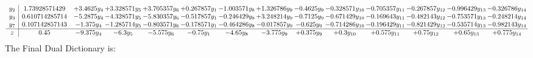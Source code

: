 \documentclass[11pt]{article}
\begin{document}
\[\begin{array}{c| c c@{\hskip 2pt} c@{\hskip 2pt} c@{\hskip 2pt} c@{\hskip 2pt} c@{\hskip 2pt} c@{\hskip 2pt} c@{\hskip 2pt} c@{\hskip 2pt} c@{\hskip 2pt} c@{\hskip 2pt} c@{\hskip 2pt} c@{\hskip 2pt} }
 y_{2}   &  1.73928571429 & + 3.4625 y_{4} & + 3.328571 y_{5} & + 3.705357 y_{6} & + 0.267857 y_{1} & -1.003571 y_{8} & + 1.326786 y_{9} & -0.4625 y_{9} & -0.328571 y_{10} & -0.705357 y_{11} & -0.267857 y_{12} & -0.996429 y_{13} & -0.326786 y_{14}\\
 y_{3}   &  0.610714285714 & -5.2875 y_{4} & -4.328571 y_{5} & -5.830357 y_{6} & -0.517857 y_{1} & -0.246429 y_{8} & + 3.248214 y_{9} & -0.7125 y_{9} & -0.671429 y_{10} & -0.169643 y_{11} & -0.482143 y_{12} & -0.753571 y_{13} & -0.248214 y_{14}\\
 y_{7}   &  0.107142857143 & -1.375 y_{4} & -1.285714 y_{5} & -0.803571 y_{6} & -0.178571 y_{1} & -0.464286 y_{8} & -0.017857 y_{9} & -0.625 y_{9} & -0.714286 y_{10} & -0.196429 y_{11} & -0.821429 y_{12} & -0.535714 y_{13} & -0.982143 y_{14}\\
\hline
z    &  0.45 & -9.375 y_{4} & -6.3 y_{5} & -5.575 y_{6} & -0.75 y_{1} & -4.65 y_{8} & -3.775 y_{9} & + 0.375 y_{9} & + 0.3 y_{10} & + 0.575 y_{11} & + 0.75 y_{12} & + 0.65 y_{13} & + 0.775 y_{14}\\
\end{array}\]
The Final Dual Dictionary is: 
\end{document}
